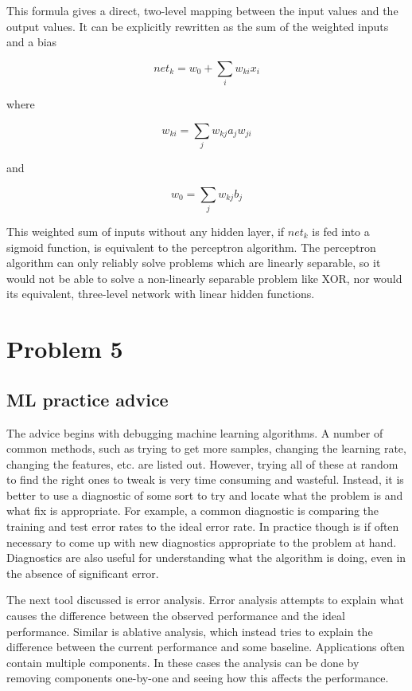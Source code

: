 \documentclass[12pt]{article}
\begin{document}
	\noindent
	This formula gives a direct, two-level mapping between the input values and the output values. It can be explicitly rewritten as the sum of the weighted inputs and a bias
	
	$$net_k = w_0+\sum_iw_{ki}x_i$$

	\noindent	
	where
	
	$$w_{ki}=\sum_jw_{kj}a_jw_{ji}$$
	
	\noindent
	and
	
	$$w_0 = \sum_jw_{kj}b_j$$
	
	This weighted sum of inputs without any hidden layer, if $net_k$ is fed into a sigmoid function, is equivalent to the perceptron algorithm. The perceptron algorithm can only reliably solve problems which are linearly separable, so it would not be able to solve a non-linearly separable problem like XOR, nor would its equivalent, three-level network with linear hidden functions.
	
\section*{Problem 5}

\subsection*{ML practice advice}
The advice begins with debugging machine learning algorithms. A number of common methods, such as trying to get more samples, changing the learning rate, changing the features, etc. are listed out. However, trying all of these at random to find the right ones to tweak is very time consuming and wasteful. Instead, it is better to use a diagnostic of some sort to try and locate what the problem is and what fix is appropriate. For example, a common diagnostic is comparing the training and test error rates to the ideal error rate. In practice though is if often necessary to come up with new diagnostics appropriate to the problem at hand. Diagnostics are also useful for understanding what the algorithm is doing, even in the absence of significant error.

The next tool discussed is error analysis. Error analysis attempts to explain what causes the difference between the observed performance and the ideal performance. Similar is ablative analysis, which instead tries to explain the difference between the current performance and some baseline. Applications often contain multiple components. In these cases the analysis can be done by removing components one-by-one and seeing how this affects the performance.
\end{document}
